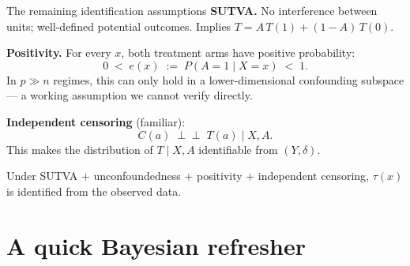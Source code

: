 \documentclass[10pt,aspectratio=169]{beamer}
\newcommand{\indep}{\perp\!\!\!\perp}
\begin{document}
\begin{frame}{The remaining identification assumptions}
\textbf{SUTVA.} No interference between units; well-defined potential outcomes. Implies $T = A\,T(1) + (1-A)\,T(0)$.

\bigskip

\textbf{Positivity.} For every $x$, both treatment arms have positive probability:
\[
0 \;<\; e(x) \;:=\; P(A=1 \mid X = x) \;<\; 1.
\]
In $p \gg n$ regimes, this can only hold in a lower-dimensional confounding subspace — a working assumption we cannot verify directly.

\bigskip

\textbf{Independent censoring} (familiar):
\[
C(a) \;\indep\; T(a) \;\Big|\; X, A.
\]
This makes the distribution of $T \mid X, A$ identifiable from $(Y, \delta)$.

\bigskip

Under SUTVA $+$ unconfoundedness $+$ positivity $+$ independent censoring, $\tau(x)$ is identified from the observed data.
\end{frame}

\section{A quick Bayesian refresher}
\end{document}
